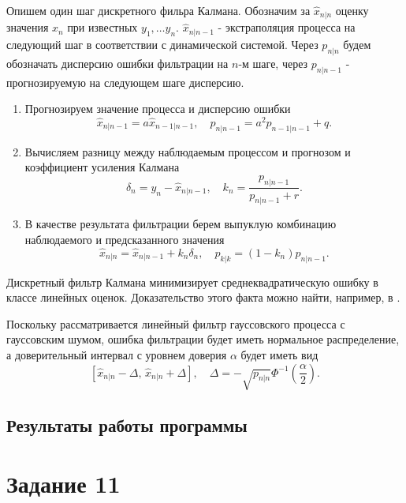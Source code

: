 \documentclass[16pt]{article}
\begin{document}
Опишем один шаг дискретного фильра Калмана. Обозначим за $\hat x_{n|n}$ оценку значения $x_n$ при известных $y_1, \ldots y_n$. $\hat x_{n|n-1}$ - экстраполяция процесса на следующий шаг в соответствии с динамической системой. Через $p_{n|n}$ будем обозначать дисперсию ошибки фильтрации на $n$-м шаге, через $p_{n|n-1}$ - прогнозируемую на следующем шаге дисперсию.

\begin{enumerate}
	\item Прогнозируем значение процесса и дисперсию ошибки
$$ \hat x_{n|n-1} = a\hat x_{n-1|n-1}, \quad p_{n|n-1} = a^2 p_{n-1|n-1} + q.$$
	\item Вычисляем разницу между наблюдаемым процессом и прогнозом и коэффициент усиления Калмана
$$ \delta_{n} = y_n - \hat x_{n|n-1}, \quad k_n = \dfrac{p_{n|n-1}}{p_{n|n-1} + r}.$$
	\item В качестве результата фильтрации берем выпуклую комбинацию наблюдаемого и предсказанного значения
$$ \hat x_{n|n} = \hat x_{n|n-1} + k_n\delta_n, \quad p_{k|k} = (1 - k_n)p_{n|n-1}. $$
\end{enumerate}

Дискретный фильтр Калмана минимизирует среднеквадратическую ошибку в классе линейных оценок. Доказательство этого факта можно найти, например, в \cite{Ostrem}.

Поскольку рассматривается линейный фильтр гауссовского процесса с гауссовским шумом, ошибка фильтрации будет иметь нормальное распределение, а доверительный интервал с уровнем доверия $\alpha$ будет иметь вид
$$[\hat x_{n|n} - \Delta, \, \hat x_{n|n} + \Delta], \quad \Delta = -\sqrt{p_{n|n}}\Phi^{-1}\left(\dfrac{\alpha}2\right).$$
\subsection{Результаты работы программы}

\section{Задание 11}
\end{document}
